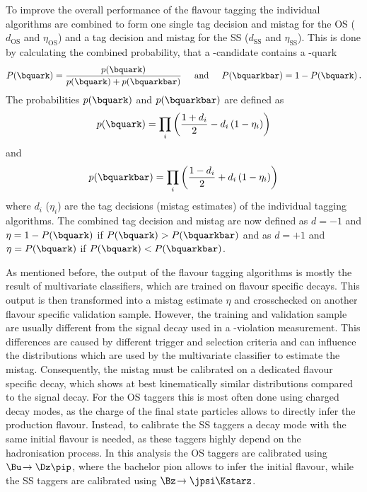 To improve the overall performance of the flavour tagging the individual algorithms are combined to form one single tag decision and mistag for the OS ($d_{\text{OS}}$ and $\eta_{\text{OS}}$) and a tag decision and mistag for the SS ($d_{\text{SS}}$ and $\eta_{\text{SS}}$).
This is done by calculating the combined probability, that a \B-candidate contains a \bquark-quark
\begin{equation}
P(\bquark)=\frac{p(\bquark)}{p(\bquark)+p(\bquarkbar)}\hspace{0.5cm}\text{and}\hspace{0.5cm}P(\bquarkbar)=1-P(\bquark)\,.
\end{equation}
The probabilities $p(\bquark)$ and $p(\bquarkbar)$ are defined as
\begin{equation}
p(\bquark)=\prod_{i}\left(\frac{1+d_i}{2}-d_i\left(1-\eta_i\right)\right)
\end{equation}
and
\begin{equation}
p(\bquarkbar)=\prod_{i}\left(\frac{1-d_i}{2}+d_i\left(1-\eta_i\right)\right)
\end{equation}
where $d_i$ ($\eta_i$) are the tag decisions (mistag estimates) of the individual tagging algorithms.
The combined tag decision and mistag are now defined as $d=-1$ and $\eta=1-P(\bquark)$ if $P(\bquark)>P(\bquarkbar)$ and as $d=+1$ and $\eta=P(\bquark)$ if $P(\bquark)<P(\bquarkbar)$.

As mentioned before, the output of the flavour tagging algorithms is mostly the result of multivariate classifiers, which are trained on flavour specific \B decays.
This output is then transformed into a mistag estimate $\eta$ and crosschecked on another flavour specific validation sample.
However, the training and validation sample are usually different from the signal decay used in a \CP-violation measurement.
This differences are caused by different trigger and selection criteria and can influence the distributions which are used by the multivariate classifier to estimate the mistag.
Consequently, the mistag must be calibrated on a dedicated flavour specific decay, which shows at best kinematically similar distributions compared to the signal decay.
For the OS taggers this is most often done using charged decay modes, as the charge of the final state particles allows to directly infer the production flavour.
Instead, to calibrate the SS taggers a decay mode with the same initial \B flavour is needed, as these taggers highly depend on the hadronisation process.
In this analysis the OS taggers are calibrated using $\Bu\!\to\Dz\pip$, where the bachelor pion allows to infer the initial flavour, while the SS taggers are calibrated using $\Bz\!\to\jpsi\Kstarz$.


